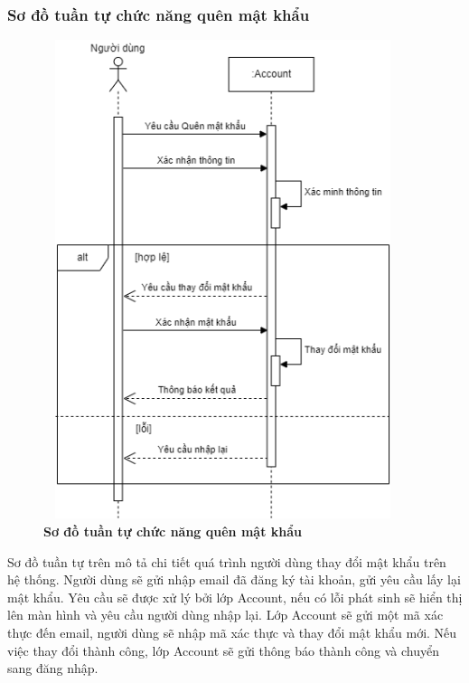 \subsubsection{Sơ đồ tuần tự chức năng quên mật khẩu}
\begin{figure}[H]
  \centering
  \includegraphics[width=10.5cm,height=14cm]{Images/sequence/sequence_forgot_password.png}
  \caption[Sơ đồ tuần tự chức năng quên mật khẩu]{\bfseries \fontsize{12pt}{0pt}
  \selectfont Sơ đồ tuần tự chức năng quên mật khẩu}
  \label{sequence_forgot_pass} %
\end{figure}
Sơ đồ tuần tự trên mô tả chi tiết quá trình người dùng thay đổi mật khẩu trên hệ thống. Người dùng sẽ gửi nhập email đã đăng ký tài khoản, gửi yêu cầu
lấy lại mật khẩu. Yêu cầu sẽ được xử lý bởi lớp Account, nếu có lỗi phát sinh sẽ hiển thị lên màn hình và yêu cầu người dùng nhập lại. Lớp Account sẽ gửi một mã xác thực
đến email, người dùng sẽ nhập mã xác thực và thay đổi mật khẩu mới. Nếu việc thay đổi thành công, lớp Account sẽ gửi thông báo thành công và chuyển sang đăng nhập.

